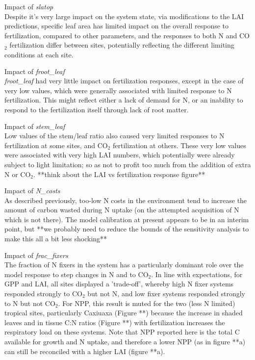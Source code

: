 \documentclass[draft,linenumbers]{agujournal}
\begin{document}
Impact of \emph{slatop}\\
Despite it’s very large impact on the system state, via modifications to the LAI predictions, specific leaf area has limited impact on the overall response to fertilization, compared to other parameters, and the responses to both N and CO$_{2}$ fertilization differ between sites, potentially reflecting the different limiting conditions at each site.  

Impact of \emph{froot\_leaf}\\
\emph{froot\_leaf} had very little impact on fertilization responses, except in the case of very low values, which were generally associated with limited response to N fertilization. This might reflect either a lack of demand for N, or an inability to respond to the fertilization itself through lack of root matter. 

Impact of \emph{stem\_leaf}\\
Low values of the stem/leaf ratio also caused very limited responses to N fertilization at some sites, and CO$_{2}$ fertilization at others. These very low values were associated with very high LAI numbers, which potentially were already subject to light limitation; so as not to profit too much from the addition of extra N or CO$_{2}$. **think about the LAI vs fertilization response figure**

Impact of \emph{N\_costs}\\
As described previously, too-low N costs in the environment tend to increase the amount of carbon wasted during N uptake (on the attempted acquisition of N which is not there).  The model calibration at present appears to be in an interim point, but **we probably need to reduce the bounds of the sensitivity analysis to make this all a bit less shocking**

Impact of \emph{frac\_fixers}\\
The fraction of N fixers in the system has a particularly dominant role over the model response to step changes in N and to CO$_{2}$. In line with expectations, for GPP and LAI, all sites displayed a 'trade-off', whereby high N fixer systems responded strongly to CO$_{2}$ but not N, and low fixer systems responded strongly to N but not CO$_{2}$. For NPP, this result is muted for the two (less N limited) tropical sites, particularly Caxiuaxa (Figure **) because the increase in shaded leaves and in tissue C:N ratios (Figure **) with fertilization increases the respiratory load on these systems.  Note that NPP reported here is the total C available for growth and N uptake, and therefore a lower NPP (as in figure **a) can still be reconciled with a higher LAI (figure **a).
\end{document}
